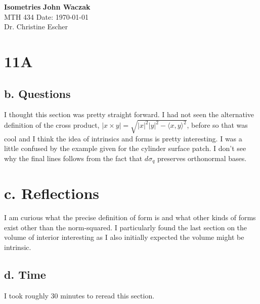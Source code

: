 \documentclass[a4paper, 11pt]{article}
\begin{document}
\noindent
\large\textbf{Isometries} \hfill \textbf{John Waczak} \\
\normalsize MTH 434 \hfill  Date: \today \\
Dr. Christine Escher \\

\section*{11A}
	\subsection*{b. Questions}
	I thought this section was pretty straight forward. I had not seen the alternative definition of the cross product, $|x\times y| = \sqrt{|x|^2|y|^2-\langle x,y\rangle^2}$, before so that was cool and I think the idea of intrinsics and forms is pretty interesting. I was a little confused by the example given for the cylinder surface patch. I don't see why the final lines follows from the fact that $d\sigma_q$ preserves orthonormal bases. 
	
	\section*{c. Reflections}
	I am curious what the precise definition of form is and what other kinds of forms exist other than the norm-squared. I particularly found the last section on the volume of interior interesting as I also initially expected the volume might be intrinsic. 
	
	
	\subsection*{d. Time}
	I took roughly 30 minutes to reread this section. 
\end{document}
